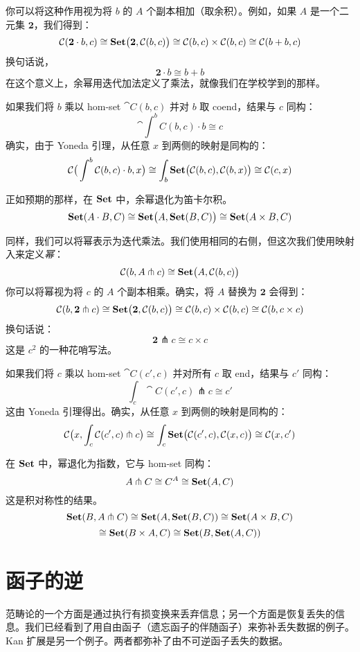 \documentclass[DaoFP]{subfiles}
\begin{document}
你可以将这种作用视为将 $b$ 的 $A$ 个副本相加（取余积）。例如，如果 $A$ 是一个二元集 $\mathbf 2$，我们得到：
\[ \mathcal{C} (\mathbf 2 \cdot b, c) \cong \mathbf{Set} \big( \mathbf 2, \mathcal{C} (b, c)\big) \cong \mathcal{C}(b, c) \times \mathcal{C}(b, c) \cong \mathcal{C}(b + b, c) \]
换句话说，
\[ \mathbf 2 \cdot b \cong b + b \]
在这个意义上，余幂用迭代加法定义了乘法，就像我们在学校学到的那样。

如果我们将 $b$ 乘以 hom-set $\cat C (b, c)$ 并对 $b$ 取 coend，结果与 $c$ 同构：
\[ \cat \int^b C(b, c) \cdot b \cong c \]
确实，由于 Yoneda 引理，从任意 $x$ 到两侧的映射是同构的：
\[ \mathcal{C} \big( \int^b \mathcal{C}(b, c) \cdot b, x\big) \cong \int_b \mathbf{Set} \big( \mathcal{C}(b, c), \mathcal{C} (b, x)\big) \cong \mathcal{C} (c, x)\]

正如预期的那样，在 $\mathbf{Set}$ 中，余幂退化为笛卡尔积。
\[ \mathbf{Set} (A \cdot B, C) \cong \mathbf{Set} \big( A, \mathbf{Set}(B, C)\big) \cong \mathbf{Set} (A \times B, C) \]

同样，我们可以将幂表示为迭代乘法。我们使用相同的右侧，但这次我们使用映射入来定义\emph{幂}：
\[ \mathcal{C} (b, A \pitchfork c) \cong \mathbf{Set}  \big(A, \mathcal{C}(b, c)\big) \]
你可以将幂视为将 $c$ 的 $A$ 个副本相乘。确实，将 $A$ 替换为 $\mathbf 2$ 会得到：
\[ \mathcal{C} (b, \mathbf 2 \pitchfork c) \cong \mathbf{Set}  \big(\mathbf 2, \mathcal{C}(b, c)\big) \cong \mathcal{C}(b, c) \times \mathcal{C}(b, c) \cong \mathcal{C} (b, c \times c)\]
换句话说：
\[ \mathbf 2 \pitchfork c \cong c \times c \]
这是 $c^2$ 的一种花哨写法。

如果我们将 $c$ 乘以 hom-set $\cat C(c', c)$ 并对所有 $c$ 取 end，结果与 $c'$ 同构：
\[ \int_c \cat C (c', c) \pitchfork c \cong c' \]
这由 Yoneda 引理得出。确实，从任意 $x$ 到两侧的映射是同构的：
\[ \mathcal{C} \big(x, \int_c \mathcal{C} (c', c) \pitchfork c\big) \cong \int_c \mathbf{Set} \big( \mathcal{C}(c', c), \mathcal{C}(x, c)\big)  \cong \mathcal{C} (x, c') \]

在 $\mathbf{Set}$ 中，幂退化为指数，它与 hom-set 同构：
\[ A \pitchfork C \cong C^A \cong \mathbf{Set} (A, C) \]
这是积对称性的结果。
\[ \mathbf{Set}(B, A \pitchfork C) \cong \mathbf{Set} (A, \mathbf{Set}(B, C)) \cong \mathbf{Set} (A \times B, C) \]
\[ \cong \mathbf{Set} (B \times A, C) \cong \mathbf{Set} (B, \mathbf{Set} (A, C))\]

\section{函子的逆}

范畴论的一个方面是通过执行有损变换来丢弃信息；另一个方面是恢复丢失的信息。我们已经看到了用自由函子（遗忘函子的伴随函子）来弥补丢失数据的例子。Kan 扩展是另一个例子。两者都弥补了由不可逆函子丢失的数据。
\end{document}
